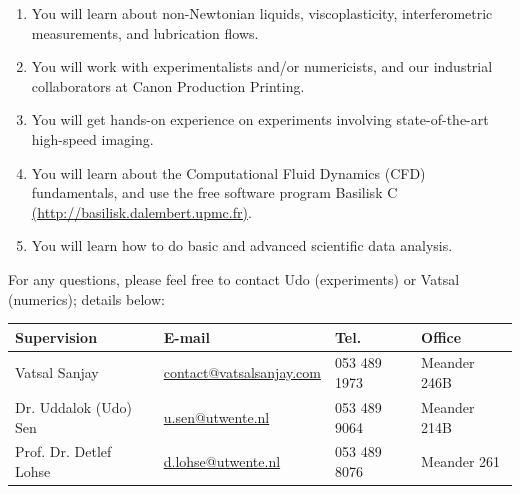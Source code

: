 \documentclass[a4paper,10pt]{article}
\begin{document}
\begin{enumerate}
\item You will learn about non-Newtonian liquids, viscoplasticity, interferometric measurements, and lubrication flows. 
\item You will work with experimentalists and/or numericists, and our industrial collaborators at Canon Production Printing. 
\item You will get hands-on experience on experiments involving state-of-the-art high-speed imaging.
\item You will learn about the Computational Fluid Dynamics (CFD) fundamentals, and use the free software program Basilisk C \href{http://basilisk.dalembert.upmc.fr}{(http://basilisk.dalembert.upmc.fr)}.
\item You will learn how to do basic and advanced scientific data analysis.
\end{enumerate}
For any questions, please feel free to contact Udo (experiments) or Vatsal (numerics); details below: 

\begin{center}
\begin{tabular}{|l|l|l|l|}
\hline \textbf{Supervision} & \textbf{E-mail} & \textbf{Tel.} & \textbf{Office} \\ 
\hline Vatsal Sanjay & \href{mailto:contact@vatsalsanjay.com}{contact@vatsalsanjay.com} & 053 489 1973 & Meander 246B \\ 
\hline Dr. Uddalok (Udo) Sen & \href{mailto:u.sen@utwente.nl}{u.sen@utwente.nl} & 053 489 9064 & Meander 214B \\ 
\hline Prof. Dr. Detlef Lohse & \href{mailto:d.lohse@utwente.nl}{d.lohse@utwente.nl} & 053 489 8076 & Meander 261 \\ 
\hline 
\end{tabular} 
\end{center}



\end{document}
